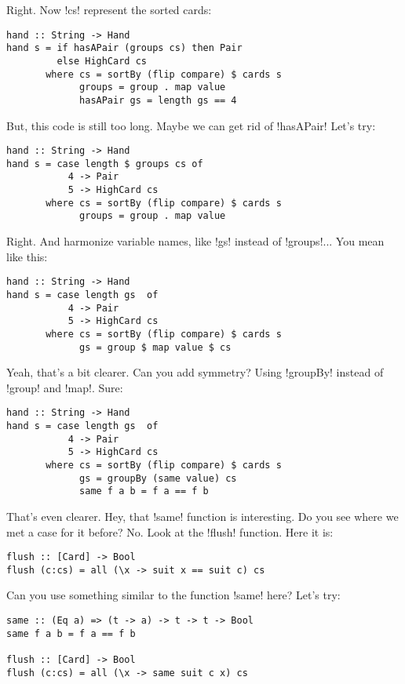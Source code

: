 \lhA \success Right. Now \il!cs! represent the sorted cards:
\begin{lstlisting}[frame=single]
hand :: String -> Hand
hand s = if hasAPair (groups cs) then Pair
         else HighCard cs
       where cs = sortBy (flip compare) $ cards s
             groups = group . map value
             hasAPair gs = length gs == 4 
\end{lstlisting} %
\success But, this code is still too long.
\lhN Maybe we can get rid of \il!hasAPair!
\lhA \success Let's try:
\begin{lstlisting}[frame=single]
hand :: String -> Hand
hand s = case length $ groups cs of
           4 -> Pair
           5 -> HighCard cs 
       where cs = sortBy (flip compare) $ cards s
             groups = group . map value
\end{lstlisting}
\success Right.
\lhN And harmonize variable names, like \il!gs! instead of \il!groups!...
\lhA \success You mean like this:
\begin{lstlisting}[frame=single]
hand :: String -> Hand
hand s = case length gs  of
           4 -> Pair
           5 -> HighCard cs 
       where cs = sortBy (flip compare) $ cards s
             gs = group $ map value $ cs
\end{lstlisting} %
\success Yeah, that's a bit clearer.
\lhN Can you add symmetry? Using \il!groupBy! instead of \il!group! and \il!map!.
\lhA \success Sure:
\begin{lstlisting}[frame=single]
hand :: String -> Hand
hand s = case length gs  of
           4 -> Pair
           5 -> HighCard cs 
       where cs = sortBy (flip compare) $ cards s
             gs = groupBy (same value) cs
             same f a b = f a == f b
\end{lstlisting} %
\success That's even clearer.
\lhN Hey, that \il!same! function is interesting. Do you see where we met a case for it before?
\lhA No.
\lhN Look at the \il!flush! function.
\lhA Here it is:
\begin{lstlisting}[frame=single]
flush :: [Card] -> Bool
flush (c:cs) = all (\x -> suit x == suit c) cs
\end{lstlisting}
\lhN Can you use something similar to the function \il!same! here?
\lhA Let's try:
\begin{lstlisting}[frame=single]
same :: (Eq a) => (t -> a) -> t -> t -> Bool
same f a b = f a == f b

flush :: [Card] -> Bool
flush (c:cs) = all (\x -> same suit c x) cs

\end{lstlisting}
